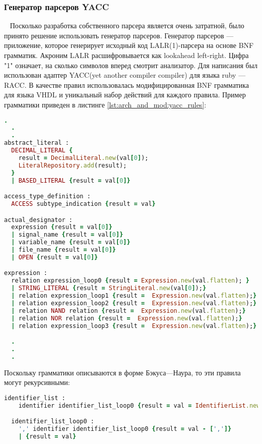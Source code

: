 \subsubsection{Генератор парсеров YACC}~
\label{sub:arch_and_mod:parser_generator}
Посколько разработка собственного парсера является очень затратной, было принято решение использовать генератор парсеров. Генератор парсеров --- приложение, которое генерирует исходный код LALR(1)-парсера на основе BNF грамматик. Акроним LALR расшифровывается как lookahead left-right. Цифра "1" означает, на сколько символов вперед смотрит анализатор. Для написания был использован адаптер YACC(yet another compiler compiler) для языка ruby --- RACC. В качестве правил использовалась модифицированная BNF грамматика для языка VHDL и уникальный набор действий для каждого правила. Пример грамматики приведен в листинге \ref{lst:arch_and_mod:yacc_rules}:
\begin{lstlisting}[language=Ruby, style=rubystyle,caption={Различные описания грамматик и действия, вызываемые при соответствии грамматики линейной последовательности}, label=lst:arch_and_mod:yacc_rules]
  .
  .
  .
abstract_literal :
  DECIMAL_LITERAL {
    result = DecimalLiteral.new(val[0]);
    LiteralRepository.add(result);
  }
  | BASED_LITERAL {result = val[0]}

access_type_definition :
  ACCESS subtype_indication {result = val}

actual_designator :
  expression {result = val[0]}
  | signal_name {result = val[0]}
  | variable_name {result = val[0]}
  | file_name {result = val[0]}
  | OPEN {result = val[0]}

expression :
  relation expression_loop0 {result = Expression.new(val.flatten); }
  | STRING_LITERAL {result = StringLiteral.new(val[0]);}
  | relation expression_loop1 {result =  Expression.new(val.flatten);}
  | relation expression_loop2 {result =  Expression.new(val.flatten);}
  | relation NAND relation {result =  Expression.new(val.flatten);}
  | relation NOR relation {result =  Expression.new(val.flatten);}
  | relation expression_loop3 {result =  Expression.new(val.flatten);}

  .
  .
  .
\end{lstlisting}
Поскольку грамматики описываются в форме Бэкуса---Наура, то эти правила могут рекурсивными:


\begin{lstlisting}[language=Ruby, style=rubystyle,caption={Пример рекурсивных правил}, label=lst:arch_and_mod:recursive_rules]
  identifier_list :
    identifier identifier_list_loop0 {result = val = IdentifierList.new(val.flatten); InitializeRepository.add(result.identifiers) }

  identifier_list_loop0 :
    ',' identifier identifier_list_loop0 {result = val - [',']}
    | {result = val}
\end{lstlisting}
